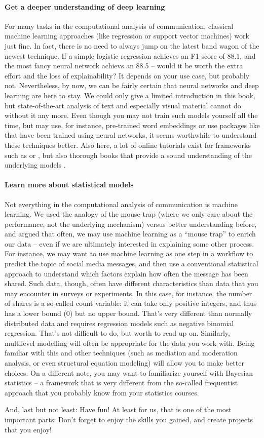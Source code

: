 \paragraph{Get a deeper understanding of deep learning} For many tasks in the computational analysis of communication, classical machine learning approaches (like regression or support vector machines) work just fine. In fact, there is no need to always jump on the latest band wagon of the newest technique. If a simple logistic regression achieves an F1-score of 88.1, and the most fancy neural network achievs an 88.5 -- would it be worth the extra effort and the loss of explainability? It depends on your use case, but probably not. Nevertheless, by now, we can be fairly certain that neural networks and deep learning are here to stay. We could only give a limited introduction in this book, but state-of-the-art analysis of text and especially visual material cannot do without it any more. Even though you may not train such models yourself all the time, but may use, for instance, pre-trained word embeddings or use packages like  that have been trained using neural networks, it seems worthwhile to understand these techniques better. Also here, a lot of online tutorials exist for frameworks such as  or , but also thorough books that provide a sound understanding of the underlying models \cite{goldberg2017}.


\paragraph{Learn more about statistical models} Not everything in the computational analysis of communication is machine learning. We used the analogy of the mouse trap (where we only care about the performance, not the underlying mechanism) versus better understanding before, and argued that often, we may use machine learning as a ``mouse trap'' to enrich our data -- even if we are ultimately interested in explaining some other process. For instance, we may want to use machine learning as one step in a workflow to predict the topic of social media messages, and then use a conventional statistical approach to understand which factors explain how often the message has been shared. Such data, though, often have different characteristics than data that you may encounter in surveys or experiments. In this case, for instance, the number of shares is a so-called count variable: it can take only positive integers, and thus has a lower bound (0) but no upper bound. That's very different than normally distributed data and requires regression models such as negative binomial regression. That's not difficult to do, but worth to read up on. Similarly, multilevel modelling will often be appropriate for the data you work with. Being familiar with this and other techniques (such as mediation and moderation analysis, or even structural equation modeling) will allow you to make better choices. On a different note, you may want to familiarize yourself with Bayesian statistics -- a framework that is very different from the so-called frequentist approach that you probably know from your statistics courses.


And, last but not least: Have fun! At least for us, that is one of the most important parts: Don't forget to enjoy the skills you gained, and create projects that you enjoy!




